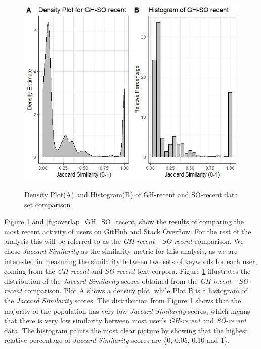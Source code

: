         \begin{figure}
          \centering
          \includegraphics[width=\textwidth]{figures/GH_SO_recent.jpeg}\\
          \caption{Density Plot(A) and Histogram(B) of GH-recent and SO-recent data set comparison}
          \label{fig:GH_SO_recent}
        \end{figure}
        
        Figure \ref{fig:GH_SO_recent} and \ref{fig:overlap_GH_SO_recent} show the results of comparing the most recent activity of users on GitHub and Stack Overflow. For the rest of the analysis this will be referred to as the \emph{GH-recent - SO-recent} comparison. We chose \emph{Jaccard Similarity} as the similarity metric for this analysis, as we are interested in measuring the similarity between two sets of keywords for each user, coming from the \emph{GH-recent} and \emph{SO-recent} text corpora. Figure \ref{fig:GH_SO_recent} illustrates the distribution of the \emph{Jaccard Similarity} scores obtained from the \emph{GH-recent - SO-recent} comparison. Plot A shows a density plot, while Plot B is a  histogram of the \emph{Jaccard Similarity} scores. The distribution from Figure \ref{fig:GH_SO_recent} shows that the majority of the population has very low \emph{Jaccard Similarity} scores, which means that there is very low similarity between most user's \emph{GH-recent} and \emph{SO-recent} data. The histogram paints the most clear picture by showing that the highest relative percentage of \emph{Jaccard Similarity} scores are \{0, 0.05, 0.10 and 1\}.
        

